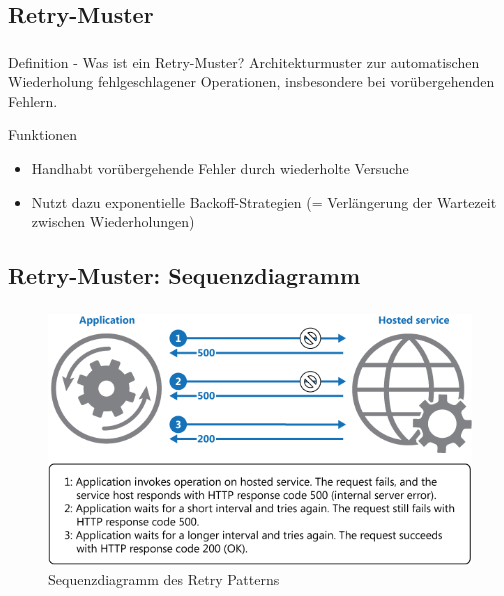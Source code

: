 \subsection{\textbf{Retry-Muster}}
\begin{frame}
    \frametitle{\insertsection}
    \framesubtitle{\insertsubsection}
    \begin{block}{Definition - Was ist ein Retry-Muster?}
        Architekturmuster zur automatischen Wiederholung fehlgeschlagener Operationen, insbesondere bei vorübergehenden Fehlern.
    \end{block}
    \begin{block}{Funktionen}
        \begin{itemize}
            \item Handhabt vorübergehende Fehler durch wiederholte Versuche
            \item Nutzt dazu exponentielle Backoff-Strategien (= Verlängerung der Wartezeit zwischen Wiederholungen)
        \end{itemize}
    \end{block}
\end{frame}

\subsection{Retry-Muster: Sequenzdiagramm}
\begin{frame}
    \frametitle{\insertsection}
    \framesubtitle{\insertsubsection}

    \begin{figure}[h]
        \centering
        \includegraphics[height=0.5\textheight]{../images/retry-pattern}
        \caption{Sequenzdiagramm des Retry Patterns}
    \end{figure}
\end{frame}

